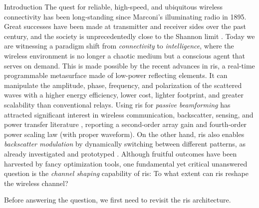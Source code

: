 \documentclass[journal]{IEEEtran}
\begin{document}
\glsresetall

\begin{section}{Introduction}
	The quest for reliable, high-speed, and ubiquitous wireless connectivity has been long-standing since Marconi's illuminating radio in 1895.
	Great successes have been made at transmitter and receiver sides over the past century, and the society is unprecedentedly close to the Shannon limit \cite{Shannon1948}.
	Today we are witnessing a paradigm shift from \emph{connectivity} to \emph{intelligence}, where the wireless environment is no longer a chaotic medium but a conscious agent that serves on demand.
	This is made possible by the recent advances in \gls{ris}, a real-time programmable metasurface made of low-power reflecting elements.
	It can manipulate the amplitude, phase, frequency, and polarization of the scattered waves \cite{Basar2019} with a higher energy efficiency, lower cost, lighter footprint, and greater scalability than conventional relays.
	Using \gls{ris} for \emph{passive beamforming} has attracted significant interest in wireless communication, backscatter, sensing, and power transfer literature \cite{Wu2019,Wu2020c,Yang2020,Zheng2021,Jia2020,Liang2022,Liu2022a,Hua2023,Wu2021d,Feng2022,Zhao2022}, reporting a second-order array gain and fourth-order power scaling law (with proper waveform).
	On the other hand, \gls{ris} also enables \emph{backscatter modulation} by dynamically switching between different patterns, as already investigated \cite{Liu2019d,Karasik2020,Basar2020,Ma2020a,Zhang2021d,Hua2022,Zhao2022a} and prototyped \cite{Tang2019a,Dai2020a}.
	Although fruitful outcomes have been harvested by fancy optimization tools, one fundamental yet critical unanswered question is the \emph{channel shaping} capability of \gls{ris}: To what extent can \gls{ris} reshape the wireless channel?

	Before answering the question, we first need to revisit the \gls{ris} architecture.


\end{section}
\end{document}
